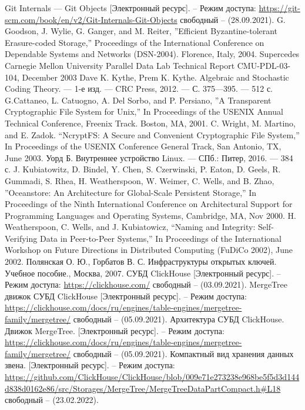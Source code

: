 \begin{thebibliography}{}
    Git Internals --- Git Objects [Электронный ресурс]. – Режим доступа: \url{https://git-scm.com/book/en/v2/Git-Internals-Git-Objects} свободный – (28.09.2021).
    G. Goodson, J. Wylie, G. Ganger, and M. Reiter, ''Efficient Byzantine-tolerant Erasure-coded Storage,'' Proceedings of the International Conference on Dependable Systems and Networks (DSN-2004). Florence, Italy, 2004. Supercedes Carnegie Mellon University Parallel Data Lab Technical Report CMU-PDL-03-104, December 2003
    Dave K. Kythe, Prem K. Kythe. Algebraic and Stochastic Coding Theory. — 1-е изд. — CRC Press, 2012. — С. 375—395. — 512 с.
    G.Cattaneo, L. Catuogno, A. Del Sorbo, and P. Persiano, ''A Transparent Cryptographic File System for Unix,'' In Proceedings of the USENIX Annual Technical Conference, Freenix Track. Boston, MA, 2001.
    C. Wright, M. Martino, and E. Zadok. “NcryptFS: A Secure and Convenient Cryptographic File System,” In Proceedings of the USENIX Conference General Track, San Antonio, TX, June 2003.
    Уорд Б. Внутреннее устройство Linux. — СПб.: Питер, 2016. — 384 с.
    J. Kubiatowitz, D. Bindel, Y. Chen, S. Czerwinski, P. Eaton, D. Geels, R. Gummadi, S. Rhea, H. Weatherspoon, W. Weimer, C. Wells, and B. Zhao, ''Oceanstore: An Architecture for Global-Scale Persistent Storage,'' In Proceedings of the Ninth International Conference on Architectural Support for Programming Languages and Operating Systems, Cambridge, MA, Nov 2000.
    H. Weatherspoon, C. Wells, and J. Kubiatowicz, “Naming and Integrity: Self-Verifying Data in Peer-to-Peer Systems,” In Proceedings of the International Workshop on Future Directions in Distributed Computing (FuDiCo 2002), June 2002.
    Полянская О. Ю., Горбатов В. С. Инфраструктуры открытых ключей. Учебное пособие., Москва, 2007.
    СУБД ClickHouse [Электронный ресурс]. – Режим доступа: \url{https://clickhouse.com/} свободный – (03.09.2021).
    MergeTree движок СУБД ClickHouse [Электронный ресурс]. – Режим доступа: \url{https://clickhouse.com/docs/ru/engines/table-engines/mergetree-family/mergetree/} свободный – (05.09.2021).
    Архитектура СУБД ClickHouse. Движок MergeTree. [Электронный ресурс]. – Режим доступа: \url{https://clickhouse.com/docs/ru/engines/table-engines/mergetree-family/mergetree/} свободный – (05.09.2021).
    Компактный вид хранения данных звена. [Электронный ресурс]. – Режим доступа: \url{https://github.com/ClickHouse/ClickHouse/blob/009e71e273238e968be5f5d3d144d838d0162e86/src/Storages/MergeTree/MergeTreeDataPartCompact.h#L18} свободный – (23.02.2022).

\end{thebibliography}
